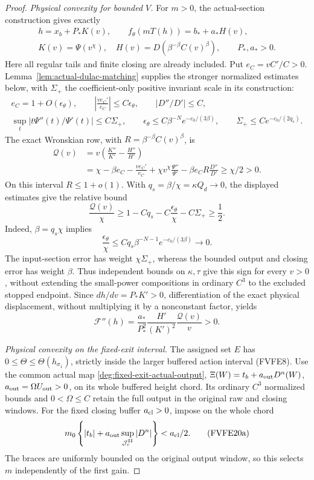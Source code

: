 \begin{proof}
\emph{Physical convexity for bounded \(V\).}
For \(m>0\), the actual-section construction gives exactly
\[
 \begin{gathered}
 h=x_b+P_*K(v),\qquad
 f_\theta(mT(h))=b_*+a_*H(v),\\
 K(v)=\Psi(v^\chi),\quad
 H(v)=D(\beta^{-\beta}C(v)^\beta),\qquad P_*,a_*>0 .
 \end{gathered}\tag{FVFE17}
\]
Here all regular tails and finite closing are already included.
Put \(e_C=vC'/C>0\). Lemma~\ref{lem:actual-dulac-matching}
supplies the stronger normalized estimates below, with \(\Sigma_+\)
the coefficient-only positive invariant scale in its construction:
\[
 \begin{gathered}
 e_C=1+O(\epsilon_\theta),\qquad
 \left|{\frac{ve_C'}{e_C}}\right|\le C\epsilon_\theta,\qquad
 |D''/D'|\le C,\\
 \sup_t|t\Psi''(t)/\Psi'(t)|\le C\Sigma_+,\qquad
 \epsilon_\theta\le C\beta^{-N}e^{-c_0/(3\beta)},\qquad
 \Sigma_+\le Ce^{-c_0/(2q_s)} .
 \end{gathered}
\]
The exact Wronskian row, with \(R=\beta^{-\beta}C(v)^\beta\), is
\[
 \begin{split}
 \mathcal Q(v)
 &=v\left({\frac{K''}{K'}}-{\frac{H''}{H'}}\right)\\
 &=\chi-\beta e_C-{\frac{ve_C'}{e_C}}
       +\chi v^\chi{\frac{\Psi''}{\Psi'}}
       -\beta e_C R{\frac{D''}{D'}}
 \ge\chi/2>0 .
 \end{split}
 \tag{FVFE18}
\]
On this interval \(R\le1+o(1)\). With
\(q_s=\beta/\chi=\kappa Q_d\longrightarrow0\),
the displayed estimates give the relative bound
\[
 \frac{\mathcal Q(v)}{\chi}
 \ge1-Cq_s-C\frac{\epsilon_\theta}{\chi}-C\Sigma_+
 \ge\frac12 .
\]
Indeed, \(\beta=q_s\chi\) implies
\[
 \frac{\epsilon_\theta}{\chi}
 \le Cq_s\beta^{-N-1}e^{-c_0/(3\beta)}\longrightarrow0.
\]
The input-section error has weight \(\chi\Sigma_+\), whereas
the bounded output and closing error has weight \(\beta\).
Thus independent bounds on \(\kappa,\tau\) give this sign for
every \(v>0\), without extending the small-power compositions
in ordinary \(C^3\) to the excluded stopped endpoint.
Since \(dh/dv=P_*K'>0\), differentiation of the exact physical
displacement, without multiplying it by a nonconstant factor, yields
\[
 \mathcal F''(h)=
 {\frac{a_*}{P_*^2}}{\frac{H'}{(K')^2}}{\frac{\mathcal Q(v)}{v}}>0 .
 \tag{FVFE19}
\]

\emph{Physical convexity on the fixed-exit interval.}
The assigned set \(E\) has
\(0\le\Theta\le\Theta(h_{\sigma_1})\), strictly inside the
larger buffered action interval (FVFE8).
Use the common actual map \eqref{deg:fixed-exit-actual-output},
$\Xi(W)=t_b+a_{\rm out}D^n(W)$, $a_{\rm out}=\Omega U_{\rm out}>0$,
on its whole buffered height chord. Its ordinary $C^3$ normalized
bounds and $0<\Omega\le C$ retain the full output in the original
raw and closing windows. For the fixed closing buffer $a_{\rm cl}>0$,
impose on the whole chord
\[
 m_0\left\{|t_b|+
 a_{\rm out}\sup_{\mathcal J_c^{\sharp\sharp}}|D^n|\right\}
 <a_{\rm cl}/2 .
 \tag{FVFE20a}
\]
The braces are uniformly bounded on the original output window,
so this selects $m$ independently of the first gain.


\end{proof}
